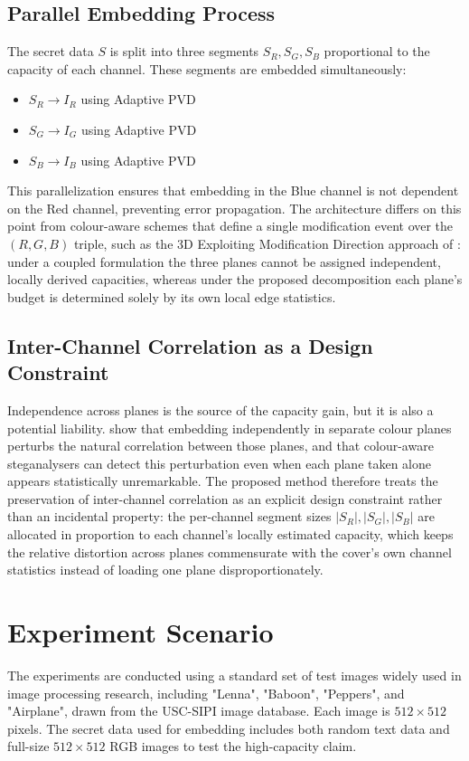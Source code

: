 \subsection{Parallel Embedding Process}
The secret data $S$ is split into three segments $S_R, S_G, S_B$ proportional to the capacity of each channel. These segments are embedded simultaneously:
\begin{itemize}
    \item $S_R \rightarrow I_R$ using Adaptive PVD
    \item $S_G \rightarrow I_G$ using Adaptive PVD
    \item $S_B \rightarrow I_B$ using Adaptive PVD
\end{itemize}
This parallelization ensures that embedding in the Blue channel is not dependent on the Red channel, preventing error propagation. The architecture differs on this point from colour-aware schemes that define a single modification event over the $(R,G,B)$ triple, such as the 3D Exploiting Modification Direction approach of \citet{aljburi2026emd3d}: under a coupled formulation the three planes cannot be assigned independent, locally derived capacities, whereas under the proposed decomposition each plane's budget is determined solely by its own local edge statistics.

\subsection{Inter-Channel Correlation as a Design Constraint}
Independence across planes is the source of the capacity gain, but it is also a potential liability. \citet{amrutha2023rgbsteganalysis} show that embedding independently in separate colour planes perturbs the natural correlation between those planes, and that colour-aware steganalysers can detect this perturbation even when each plane taken alone appears statistically unremarkable. The proposed method therefore treats the preservation of inter-channel correlation as an explicit design constraint rather than an incidental property: the per-channel segment sizes $|S_R|, |S_G|, |S_B|$ are allocated in proportion to each channel's locally estimated capacity, which keeps the relative distortion across planes commensurate with the cover's own channel statistics instead of loading one plane disproportionately.

\section{Experiment Scenario}
The experiments are conducted using a standard set of test images widely used in image processing research, including "Lenna", "Baboon", "Peppers", and "Airplane", drawn from the USC-SIPI image database. Each image is $512 \times 512$ pixels.
The secret data used for embedding includes both random text data and full-size $512 \times 512$ RGB images to test the high-capacity claim.


